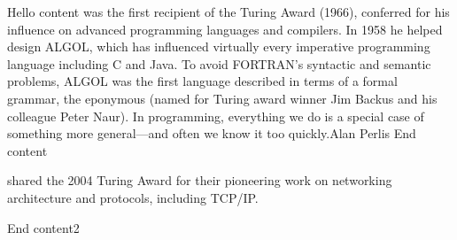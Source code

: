 Hello content
%
  {was the first recipient of the Turing Award (1966), conferred
  for his influence on advanced programming languages and compilers.
  In 1958 he helped design ALGOL,
  which has influenced virtually every imperative programming language
  including C and Java.  To avoid FORTRAN's
  syntactic and semantic problems, ALGOL was the first language
  described in terms of a formal grammar, the eponymous
   (named for Turing award
  winner Jim Backus and his colleague Peter Naur).}%
  {In programming, everything we do is a special case of
 something more general---and often we know it too quickly.}{Alan
    Perlis}
End content

%
{shared the 2004 Turing Award for their pioneering work on networking
architecture and protocols, including TCP/IP.}{}{}

End content2



